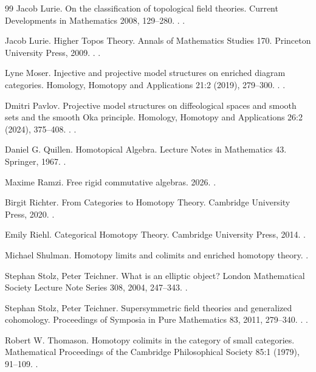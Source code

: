 \documentclass{amsart}
\theoremstyle{definition}
\numberwithin{equation}{subsection}
\numberwithin{subsubsection}{subsection}
\begin{document}
\begin{thebibliography}{99}
  Jacob Lurie.
  On the classification of topological field theories.
  Current Developments in Mathematics 2008, 129--280.
  .
  .

  Jacob Lurie.
  Higher Topos Theory.
  Annals of Mathematics Studies 170.
  Princeton University Press, 2009.
  .
  .

  Lyne Moser.
  Injective and projective model structures on enriched diagram categories.
  Homology, Homotopy and Applications 21:2 (2019), 279--300.
  .
  .

  Dmitri Pavlov.
  Projective model structures on diffeological spaces and smooth sets and the smooth Oka principle.
  Homology, Homotopy and Applications 26:2 (2024), 375--408.
  .
  .

  Daniel G. Quillen.
  Homotopical Algebra.
  Lecture Notes in Mathematics 43.
  Springer, 1967.
  .

  Maxime Ramzi.
  Free rigid commutative algebras.
  2026.
  .

  Birgit Richter.
  From Categories to Homotopy Theory.
  Cambridge University Press, 2020.
  .

  Emily Riehl.
  Categorical Homotopy Theory.
  Cambridge University Press, 2014.
  .

  Michael Shulman.
  Homotopy limits and colimits and enriched homotopy theory.
  .

  Stephan Stolz, Peter Teichner.
  What is an elliptic object?
  London Mathematical Society Lecture Note Series 308, 2004, 247--343.
  .

  Stephan Stolz, Peter Teichner.
  Supersymmetric field theories and generalized cohomology.
  Proceedings of Symposia in Pure Mathematics 83, 2011, 279--340.
  .
  .

  Robert W. Thomason.
  Homotopy colimits in the category of small categories.
  Mathematical Proceedings of the Cambridge Philosophical Society 85:1 (1979), 91--109.
  .

\end{thebibliography}
\end{document}
